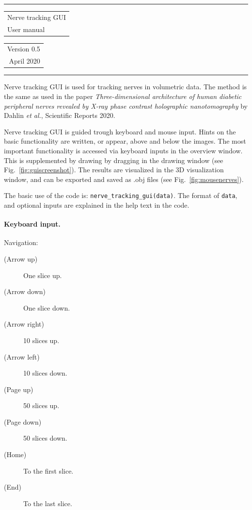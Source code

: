 \documentclass[paper=a4, fontsize=8pt]{article}
\begin{document}
	\begin{large}\hrule height 1pt
		\begin{tabular}{@{}l@{}} Nerve tracking GUI \\ User manual\end{tabular}
		\begin{tabular}{@{}r@{}} Version 0.5 \\ April 2020\end{tabular}\hrule	
	\end{large}\par\vspace{\baselineskip}
	
Nerve tracking GUI is used for tracking nerves in volumetric data. The method is the same as used in the paper \emph{Three-dimensional architecture of human diabetic peripheral nerves revealed by X-ray phase contrast holographic nanotomography} by Dahlin \emph{et al.}, Scientific Reports 2020.

Nerve tracking GUI is guided trough keyboard and mouse input. Hints on the basic functionality are written, or appear, above and below the images. The most important functionality is accessed via keyboard inputs in the overview window. This is supplemented by drawing by dragging in the drawing window (see Fig.~\ref{fig:guiscreenshot}). The results are visualized in the 3D visualization window, and can be exported and saved as .obj files (see Fig.~\ref{fig:mousenerves}).

The basic use of the code is: \texttt{nerve\_tracking\_gui(data)}. The format of \texttt{data}, and  optional inputs are explained in the help text in the code.

\paragraph{Keyboard input.} Navigation:
\begin{description}
		\item[(Arrow up)] One slice up.
		\item[(Arrow down)] One slice down.
		\item[(Arrow right)] 10 slices up.
		\item[(Arrow left)] 10 slices down.
		\item[(Page up)] 50 slices up.
		\item[(Page down)] 50 slices down.
		\item[(Home)] To the first slice.
		\item[(End)] To the last slice.
\end{description}
\end{document}
